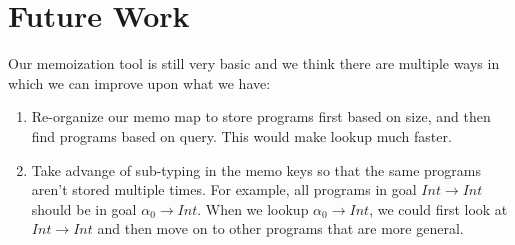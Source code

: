 \documentclass[acmsmall,nonacm]{acmart}
\begin{document}
\section{Future Work}
\label{future}

Our memoization tool is still very basic and we think there are multiple ways in
which we can improve upon what we have:

\begin{enumerate}
  \item Re-organize our memo map to store programs first based on size, and then 
        find programs based on query. This would make lookup much faster.
  \item Take advange of sub-typing in the memo keys so that the same programs
        aren't stored multiple times. For example, all programs in goal 
        $Int \to Int$ should be in goal $\alpha_0 \to Int$. When
        we lookup $\alpha_0 \to Int$, we could first look at $Int \to Int$
        and then move on to other programs that are more general.
\end{enumerate}


 
\end{document}
